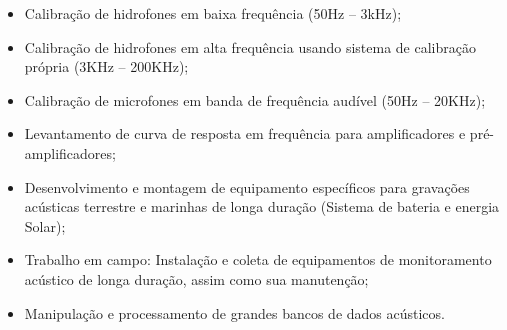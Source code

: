 \documentclass[a4paper,10pt]{article}
\begin{document}
\begin{itemize}
    \item Calibração de hidrofones em baixa frequência (50Hz – 3kHz);
    \item Calibração de hidrofones em alta frequência usando sistema de calibração própria (3KHz – 200KHz);
    \item Calibração de microfones em banda de frequência audível (50Hz – 20KHz);
    \item Levantamento de curva de resposta em frequência para amplificadores e pré-amplificadores;
    \item Desenvolvimento e montagem de equipamento específicos para gravações acústicas terrestre e marinhas de longa duração (Sistema de bateria e energia Solar);
    \item Trabalho em campo: Instalação e coleta de equipamentos de monitoramento acústico de longa duração, assim como sua manutenção;
    \item Manipulação e processamento de grandes bancos de dados acústicos.\\
\end{itemize}

\end{document}
